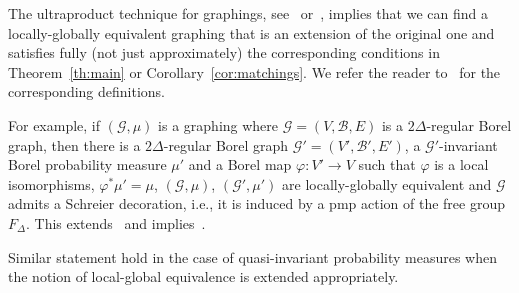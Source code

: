 \documentclass[AHL,Unicode,longabstracts,published]{cedram}
\newcommand{\clG}{\mathcal{G}}
\newcommand{\clB}{\mathcal{B}}
\newcommand{\clG}{\mathcal{G}}
\begin{document}
The ultraproduct technique for graphings, see~\cite{Elek} or~\cite{KecConleyT-D}, implies that we can find a locally-globally equivalent graphing that is an extension of the original one and satisfies fully (not just approximately) the corresponding conditions in Theorem~\ref{th:main} or Corollary~\ref{cor:matchings}. We refer the reader to~\cite[Chapter~19]{Lovasz} for the corresponding definitions.

For example, if $(\clG,\mu)$ is a graphing where $\clG=(V,\clB,E)$ is a $2\Delta$-regular Borel graph, then there is a $2\Delta$-regular Borel graph $\clG'=(V',\clB',E')$, a $\clG'$-invariant Borel probability measure $\mu'$ and a Borel map $\varphi:V'\to V$ such that $\varphi$ is a local isomorphisms, $\varphi^*\mu'=\mu$, $(\clG,\mu)$, $(\clG',\mu')$ are locally-globally equivalent and $\clG$ admits a Schreier decoration, i.e., it is induced by a pmp action of the free group $F_{\Delta}$. This extends~\cite[Corollary~4]{Laszlo} and implies~\cite[Theorem~1]{Laszlo}.

Similar statement hold in the case of quasi-invariant probability measures when the notion of local-global equivalence is extended appropriately.

\vspace{20pt}



\end{document}
